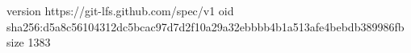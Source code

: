 version https://git-lfs.github.com/spec/v1
oid sha256:d5a8c56104312dc5bcac97d7d2f10a29a32ebbbb4b1a513afe4bebdb389986fb
size 1383
